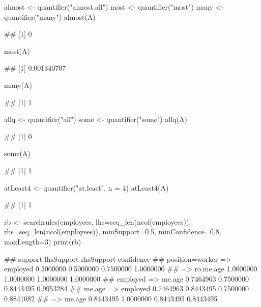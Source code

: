 \documentclass{article}\usepackage[]{graphicx}\usepackage[]{color}
\begin{document}
\begin{Schunk}
% --begin: "quant5"
\begin{Sinput}
almost <- quantifier("almost.all")
most <- quantifier("most")
many <- quantifier("many")
almost(A)
\end{Sinput}
\begin{Soutput}
## [1] 0
\end{Soutput}
\begin{Sinput}
most(A)
\end{Sinput}
\begin{Soutput}
## [1] 0.001340707
\end{Soutput}
\begin{Sinput}
many(A)
\end{Sinput}
\begin{Soutput}
## [1] 1
\end{Soutput}
%
% --end: "quant5"
\end{Schunk}

\begin{Schunk}
% --begin: "quant6"
\begin{Sinput}
allq <- quantifier("all")
some <- quantifier("some")
allq(A)
\end{Sinput}
\begin{Soutput}
## [1] 0
\end{Soutput}
\begin{Sinput}
some(A)
\end{Sinput}
\begin{Soutput}
## [1] 1
\end{Soutput}
%
% --end: "quant6"
\end{Schunk}

\begin{Schunk}
% --begin: "quant7"
\begin{Sinput}
atLeast4 <- quantifier("at.least", n = 4)
atLeast4(A)
\end{Sinput}
\begin{Soutput}
## [1] 1
\end{Soutput}
%
% --end: "quant7"
\end{Schunk}

\begin{Schunk}
% --begin: "searchrules"
\begin{Sinput}
rb <- searchrules(employees,
                  lhs=seq_len(ncol(employees)),
                  rhs=seq_len(ncol(employees)),
                  minSupport=0.5,
                  minConfidence=0.8,
                  maxLength=3)
print(rb)
\end{Sinput}
\begin{Soutput}
##                               support lhsSupport rhsSupport confidence
## position=worker => employed 0.5000000  0.5000000  0.7500000  1.0000000
##  => ro.me.age               1.0000000  1.0000000  1.0000000  1.0000000
## employed => me.age          0.7464963  0.7500000  0.8443495  0.9953284
## me.age => employed          0.7464963  0.8443495  0.7500000  0.8841082
##  => me.age                  0.8443495  1.0000000  0.8443495  0.8443495
\end{Soutput}
%
% --end: "searchrules"
\end{Schunk}
\end{document}
